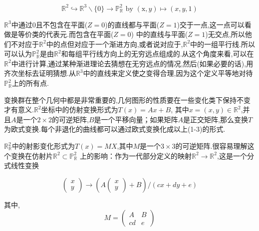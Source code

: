 \documentclass[UTF8]{book}
\begin{document}
		\vspace{-9mm}
		\begin{equation*}
		\mathbb{R}^{2} \hookrightarrow \mathbb{R}^{3} \backslash\{0\} \rightarrow \mathbb{P}^{2}_{\mathbb{R}} \text { by }(\mathrm{x}, y) \mapsto(x, y, 1)
		\end{equation*}
		\vspace{5mm}
	
		$\mathbb{R}^{3}$中通过$ 0 $且不包含在平面($ Z=0 $)的直线都与平面($ Z=1 $)交于一点,这一点可以看做是等价类的代表元.而包含在平面($ Z=0 $) 中的直线与平面($ Z=1 $)无交点,所以他们不对应于$\mathbb{R}^{2}$中的点但对应于一个渐进方向,或者说对应于,$\mathbb{R}^{2}$中的一组平行线.所以可以认为$\mathbb{P}^{2}_{	\mathbb{R}}$是由$\mathbb{R}^{2}$和每组平行线方向上的无穷远点组成的.从这个角度来看,可以在$\mathbb{R}^{2}$中进行计算,通过某种渐进理论去猜想在无穷远点的情况,然后(如果必要的话),用齐次坐标去证明猜想.从$\mathbb{R}^{3}$中的直线来定义使之变得合理,因为这个定义平等地对待$\mathbb{P}^{2}_{\mathbb{R}}$上的所有点.
		
		
		变换群在整个几何中都是非常重要的,几何图形的性质要在一些变化类下保持不变才有意义.$\mathbb{R}^{2}$坐标中的仿射变换形式为$ T(x)=Ax+B $, 其中$x=(x,y)\in \mathbb{R}^{2}$,并且$ A $是一个$2\times2$的可逆矩阵,$ B $是一个平移向量；如果矩阵$ A $是正交矩阵,那么变换$ T $为欧式变换.每个非退化的曲线都可以通过欧式变换化成以上(1-3)的形式.
		
		
		$\mathbb{R}^{2}_{\mathbb{R}}$中的射影变化形式为$ T(x)=MX $,其中$ M $是一个$3\times3$的可逆矩阵.很容易理解这个变换在仿射片$\mathbb{R}^{2} \subset \mathbb{P}^{2}_{\mathbb{R}}$ 上的影响：作为一代部分定义的映射$\mathbb{R}^{2}\rightarrow \mathbb{R}^{2}$,这是一个分式线性变换
		
		\begin{equation*}
		\begin{pmatrix} x \\ y  \end{pmatrix}
		\rightarrow (A\begin{pmatrix} x \\ y\end{pmatrix}+B)/(cx+dy+e)
		\end{equation*}
	
		其中,
		\begin{equation*}
		M=\begin{pmatrix} A  & B \\ c  d &e\end{pmatrix}
		\end{equation*}
	
\end{document}
